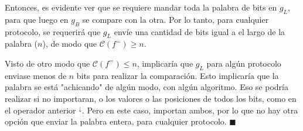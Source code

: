 \documentclass[letter]{article}
\begin{document}
\begin{pregunta}{2}
\begin{enumerate}
		Entonces, es evidente ver que se requiere mandar toda la palabra de bits en $g_L$, para que luego en $g_B$ se compare con la otra. Por lo tanto, para cualquier protocolo, se requerirá que $g_L$ envíe una cantidad de bits igual a el largo de la palabra ($n$), de modo que $\mathcal{C}(f^=)\geq n$.
		
		Visto de otro modo que $\mathcal{C}(f^=)\le n$, implicaría que $g_L$ para algún protocolo enviase menos de $n$ bits para realizar la comparación. Esto implicaría que la palabra se está "achicando" de algún modo, con algún algoritmo. Eso se podría realizar si no importaran, o los valores o las posiciones de todos los bits, como en el operador anterior $ ^\downarrow$. Pero en este caso, importan ambos, por lo que no hay otra opción que enviar la palabra entera, para cualquier protocolo.
		\flushright$\blacksquare$
		\end{enumerate}
	\end{pregunta}
\end{document}
